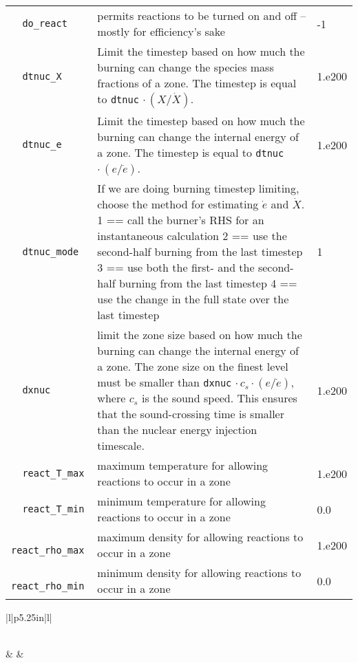 \begin{landscape}
{\begin{center}
\begin{longtable}{|l|p{5.25in}|l|}
\rowcolor{tableShade}
\verb=  do_react  = &   permits reactions to be turned on and off -- mostly for efficiency's sake  &  -1 \\
\verb=  dtnuc_X  = &   Limit the timestep based on how much the burning can change the species mass fractions of a zone. The timestep is equal to {\tt dtnuc}  $\cdot\,(X / \dot{X})$.  &  1.e200 \\
\rowcolor{tableShade}
\verb=  dtnuc_e  = &   Limit the timestep based on how much the burning can change the internal energy of a zone. The timestep is equal to {\tt dtnuc}  $\cdot\,(e / \dot{e})$.  &  1.e200 \\
\verb=  dtnuc_mode  = &   If we are doing burning timestep limiting, choose the method for estimating $\dot{e}$ and $\dot{X}$. 1 == call the burner's RHS for an instantaneous calculation 2 == use the second-half burning from the last timestep 3 == use both the first- and the second-half burning from the last timestep 4 == use the change in the full state over the last timestep  &  1 \\
\rowcolor{tableShade}
\verb=  dxnuc  = &   limit the zone size based on how much the burning can change the internal energy of a zone. The zone size on the finest level must be smaller than {\tt dxnuc} $\cdot\, c_s\cdot (e / \dot{e})$, where $c_s$ is the sound speed. This ensures that the sound-crossing time is smaller than the nuclear energy injection timescale.  &  1.e200 \\
\verb=  react_T_max  = &   maximum temperature for allowing reactions to occur in a zone  &  1.e200 \\
\rowcolor{tableShade}
\verb=  react_T_min  = &   minimum temperature for allowing reactions to occur in a zone  &  0.0 \\
\verb=  react_rho_max  = &   maximum density for allowing reactions to occur in a zone  &  1.e200 \\
\rowcolor{tableShade}
\verb=  react_rho_min  = &   minimum density for allowing reactions to occur in a zone  &  0.0 \\


\end{longtable}
\end{center}

} %


{\small

\renewcommand{\arraystretch}{1.5}
%
\begin{center}
\begin{longtable}{|l|p{5.25in}|l|}
\caption[ refinement
 parameters.]{ refinement
 parameters.} \label{table:  refinement
 parameters. runtime} \\
%
\hline {} & 
        & 
        \\ \hline 
\endfirsthead


\end{longtable}
\end{center}}
\end{landscape}
